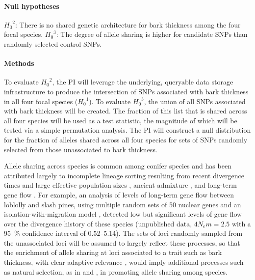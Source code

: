 \paragraph{Null hypotheses}  ${H_0}^2$: There is no shared genetic architecture for bark thickness among 
the four focal species. ${H_0}^3$: The degree of allele sharing is higher for candidate SNPs than randomly 
selected control SNPs.

\paragraph{Methods} To evaluate ${H_0}^2$, the PI will leverage the underlying, queryable data storage infrastructure 
to produce the intersection of SNPs associated with bark thickness in all four focal species (${H_0}^1$). To 
evaluate ${H_{0}}^3$, the union of all SNPs associated with bark thickness will be created. The fraction of this list 
that is shared across all four species will be used as a test statistic, the magnitude of which will be tested via a simple 
permutation analysis. The PI will construct a null distribution for the fraction of alleles shared across all four species 
for sets of SNPs randomly selected from those unassociated to bark thickness. 

Allele sharing across species is common among conifer species and has been attributed largely to incomplete lineage 
sorting resulting from recent divergence times and large effective population sizes \citep{Syring:2007gd,Willyard:2009ez}, 
ancient admixture \citep{Liston:2007cx}, and long-term gene flow \citep{Zhou:2010hk}. For example, an analysis of 
levels of long-term gene flow between loblolly and slash pines, using multiple random sets of 50 nuclear genes and an 
isolation-with-migration model \citep{Becquet:2007js}, detected low but significant levels of gene flow over the divergence history 
of these species (unpublished data, $4 N_{e}m = 2.5$ with a \SI{95}{\percent} confidence interval of 0.52--5.14). The sets of loci 
randomly sampled from the unassociated loci will be assumed to largely reflect these processes, so that the 
enrichment of allele sharing at loci associated to a trait such as bark thickness, with clear adaptive relevance 
\citep{He:2012bz}, would imply additional processes such as natural selection, as in \citet{Segurel:vf} and 
\citet{Roux:2012eb}, in promoting allele sharing among species.

